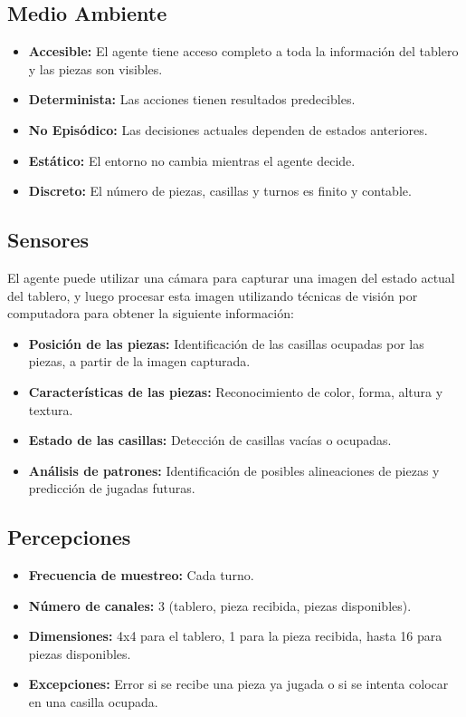 \documentclass[conference]{IEEEtran}
\begin{document}
\subsection{Medio Ambiente}
\begin{itemize}
	\item \textbf{Accesible:} El agente tiene acceso completo a toda la información del tablero y las piezas son visibles.
	\item \textbf{Determinista:} Las acciones tienen resultados predecibles.
	\item \textbf{No Episódico:} Las decisiones actuales dependen de estados anteriores.
	\item \textbf{Estático:} El entorno no cambia mientras el agente decide.
	\item \textbf{Discreto:} El número de piezas, casillas y turnos es finito y contable.
\end{itemize}

\subsection{Sensores}

El agente puede utilizar una cámara para capturar una imagen del estado actual del tablero, y luego procesar esta imagen utilizando técnicas de visión por computadora para obtener la siguiente información:

\begin{itemize}
	\item \textbf{Posición de las piezas:} Identificación de las casillas ocupadas por las piezas, a partir de la imagen capturada.
	\item \textbf{Características de las piezas:} Reconocimiento de color, forma, altura y textura.
	\item \textbf{Estado de las casillas:} Detección de casillas vacías o ocupadas.
	\item \textbf{Análisis de patrones:} Identificación de posibles alineaciones de piezas y predicción de jugadas futuras.
\end{itemize}

\subsection{Percepciones}

\begin{itemize}
	\item \textbf{Frecuencia de muestreo:} Cada turno.
	\item \textbf{Número de canales:} 3 (tablero, pieza recibida, piezas disponibles).
	\item \textbf{Dimensiones:} 4x4 para el tablero, 1 para la pieza recibida, hasta 16 para piezas disponibles.
	\item \textbf{Excepciones:} Error si se recibe una pieza ya jugada o si se intenta colocar en una casilla ocupada.
\end{itemize}
\end{document}
